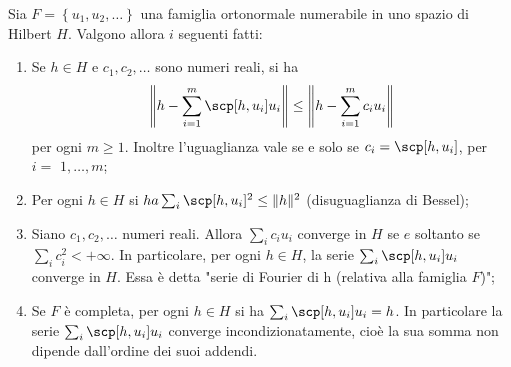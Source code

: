 \begin{shadedTheorem}\label{thm: 3.6 serie di Fourier astratta}
    Sia $F=\left\{u_{1}, u_{2}, \ldots\right\}$ una famiglia ortonormale numerabile in uno spazio di Hilbert $H$. Valgono allora $i$ seguenti fatti:
    \begin{enumerate}
        \item Se $h \in H$ e $c_{1}, c_{2}, \ldots$ sono numeri reali, si ha
        \[
        \left\|h-\sum_{i=1}^{m}\scp[h, u_{i}] u_{i}\right\| \leq\left\|h-\sum_{i=1}^{m} c_{i} u_{i}\right\|
        \]    
        per ogni $m \geq 1$. Inoltre l'uguaglianza vale se e solo se $c_{i}=\scp[h, u_{i}]$, per $i=$ $1, \ldots, m$;
        \item Per ogni $h \in H$ si $h a \sum_{i}\scp[h, u_{i}]^{2} \leq\|h\|^{2}$ (disuguaglianza di Bessel);
        \item Siano $c_{1}, c_{2}, \ldots$ numeri reali. Allora $\sum_{i} c_{i} u_{i}$ converge in $H$ se $e$ soltanto se $\sum_{i} c_{i}^{2}<+\infty$. In particolare, per ogni $h \in H$, la serie $\sum_{i}\scp[h, u_{i}] u_{i}$ converge in $H$. Essa è detta "serie di Fourier di h (relativa alla famiglia $F$)";  
        \item Se $F$ è completa, per ogni $h \in H$ si ha $\sum_{i}\scp[h, u_{i}] u_{i}=h$. In particolare la serie $\sum_{i}\scp[h, u_{i}]u_{i}$ converge incondizionatamente, cioè la sua somma non dipende dall'ordine dei suoi addendi.
    \end{enumerate}
\end{shadedTheorem}
